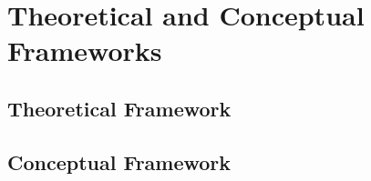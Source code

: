 \chapter{Theoretical and Conceptual Frameworks}
\section{Theoretical Framework}
\section{Conceptual Framework}